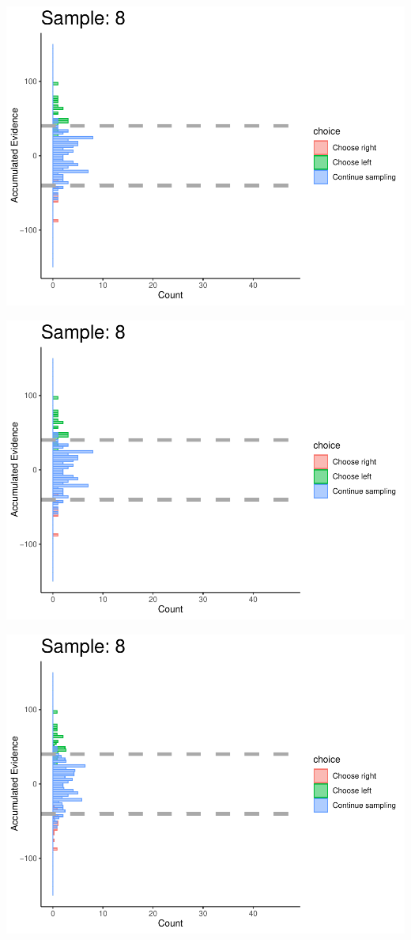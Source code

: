 \documentclass[
]{book}
\begin{document}
\begin{center}\includegraphics[width=0.8\linewidth]{LateNightBayes_files/figure-latex/collapsing_check-74} \end{center}

\begin{center}\includegraphics[width=0.8\linewidth]{LateNightBayes_files/figure-latex/collapsing_check-75} \end{center}

\begin{center}\includegraphics[width=0.8\linewidth]{LateNightBayes_files/figure-latex/collapsing_check-76} \end{center}
\end{document}
